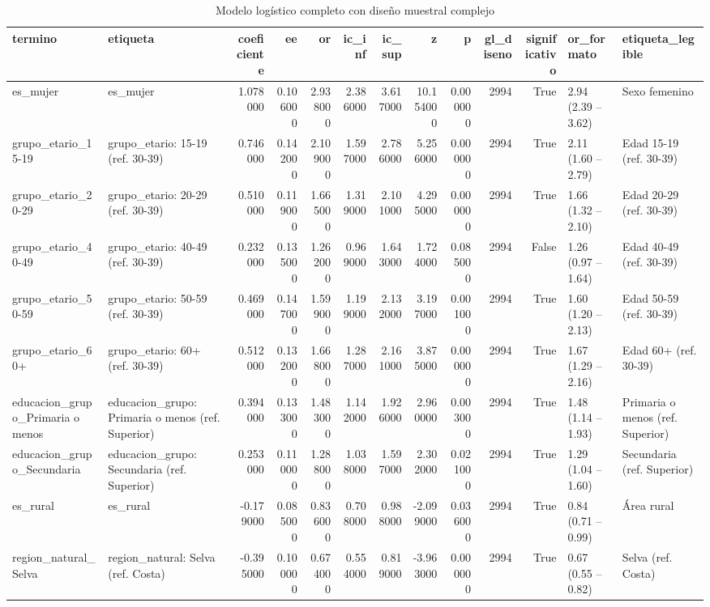\begin{table}[htbp]
\caption{Modelo logístico completo con diseño muestral complejo}
\label{tab:tabla_22_logistica_diseno_complejo}
\begin{tabular}{llrrrrrrrrrll}
\toprule
termino & etiqueta & coeficiente & ee & or & ic\_inf & ic\_sup & z & p & gl\_diseno & significativo & or\_formato & etiqueta\_legible \\
\midrule
es\_mujer & es\_mujer & 1.078000 & 0.106000 & 2.938000 & 2.386000 & 3.617000 & 10.154000 & 0.000000 & 2994 & True & 2.94 (2.39 – 3.62) & Sexo femenino \\
grupo\_etario\_15-19 & grupo\_etario: 15-19 (ref. 30-39) & 0.746000 & 0.142000 & 2.109000 & 1.597000 & 2.786000 & 5.256000 & 0.000000 & 2994 & True & 2.11 (1.60 – 2.79) & Edad 15-19 (ref. 30-39) \\
grupo\_etario\_20-29 & grupo\_etario: 20-29 (ref. 30-39) & 0.510000 & 0.119000 & 1.665000 & 1.319000 & 2.101000 & 4.295000 & 0.000000 & 2994 & True & 1.66 (1.32 – 2.10) & Edad 20-29 (ref. 30-39) \\
grupo\_etario\_40-49 & grupo\_etario: 40-49 (ref. 30-39) & 0.232000 & 0.135000 & 1.262000 & 0.969000 & 1.643000 & 1.724000 & 0.085000 & 2994 & False & 1.26 (0.97 – 1.64) & Edad 40-49 (ref. 30-39) \\
grupo\_etario\_50-59 & grupo\_etario: 50-59 (ref. 30-39) & 0.469000 & 0.147000 & 1.599000 & 1.199000 & 2.132000 & 3.197000 & 0.001000 & 2994 & True & 1.60 (1.20 – 2.13) & Edad 50-59 (ref. 30-39) \\
grupo\_etario\_60+ & grupo\_etario: 60+ (ref. 30-39) & 0.512000 & 0.132000 & 1.668000 & 1.287000 & 2.161000 & 3.875000 & 0.000000 & 2994 & True & 1.67 (1.29 – 2.16) & Edad 60+ (ref. 30-39) \\
educacion\_grupo\_Primaria o menos & educacion\_grupo: Primaria o menos (ref. Superior) & 0.394000 & 0.133000 & 1.483000 & 1.142000 & 1.926000 & 2.960000 & 0.003000 & 2994 & True & 1.48 (1.14 – 1.93) & Primaria o menos (ref. Superior) \\
educacion\_grupo\_Secundaria & educacion\_grupo: Secundaria (ref. Superior) & 0.253000 & 0.110000 & 1.288000 & 1.038000 & 1.597000 & 2.302000 & 0.021000 & 2994 & True & 1.29 (1.04 – 1.60) & Secundaria (ref. Superior) \\
es\_rural & es\_rural & -0.179000 & 0.085000 & 0.836000 & 0.708000 & 0.988000 & -2.099000 & 0.036000 & 2994 & True & 0.84 (0.71 – 0.99) & Área rural \\
region\_natural\_Selva & region\_natural: Selva (ref. Costa) & -0.395000 & 0.100000 & 0.674000 & 0.554000 & 0.819000 & -3.963000 & 0.000000 & 2994 & True & 0.67 (0.55 – 0.82) & Selva (ref. Costa) \\

\end{tabular}
\end{table}
